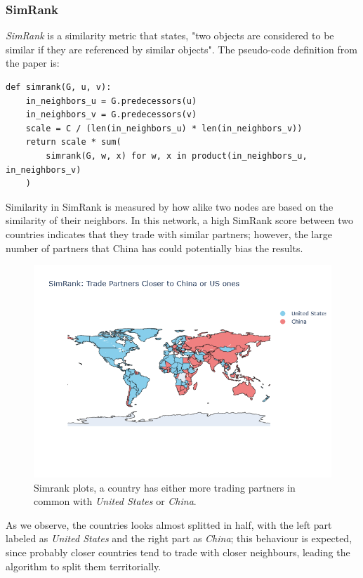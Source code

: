 \documentclass[12pt, a4paper]{article}
\begin{document}
\subsubsection{SimRank}

\textit{SimRank} is a similarity metric that states, "two objects are considered to be similar if they are referenced by similar objects".
The pseudo-code definition from the paper is:
\begin{verbatim}
def simrank(G, u, v):
    in_neighbors_u = G.predecessors(u)
    in_neighbors_v = G.predecessors(v)
    scale = C / (len(in_neighbors_u) * len(in_neighbors_v))
    return scale * sum(
        simrank(G, w, x) for w, x in product(in_neighbors_u, in_neighbors_v)
    )
\end{verbatim}

Similarity in SimRank is measured by how alike two nodes are based on the similarity of their neighbors. In this network, a high SimRank score between two countries indicates that they trade with similar partners; however, the large number of partners that China has could potentially bias the results.

\begin{figure}[!ht]
\centering
\includegraphics[width=.8\textwidth]{figures/question4/figure_11.png}
\vspace{1em}
\captionsetup{font=scriptsize,labelfont=bf}
\caption{Simrank plots, a country has either more trading partners in common with \textit{United States} or \textit{China}.}
\label{fig:figure11}
\end{figure}

As we observe, the countries looks almost splitted in half, with the left part labeled as \textit{United States} and the right part as \textit{China}; this behaviour is expected, since probably closer countries tend to trade with closer neighbours, leading the algorithm to split them territorially.
\end{document}
